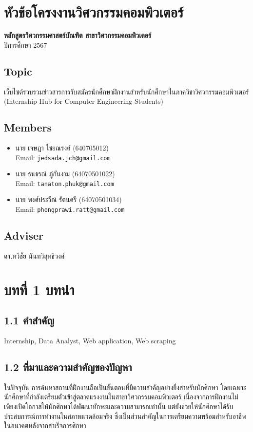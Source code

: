 \documentclass[12pt,oneside,a4paper]{article}
\begin{document}
\section*{หัวข้อโครงงานวิศวกรรมคอมพิวเตอร์}
\textbf{หลักสูตรวิศวกรรมศาสตร์บัณฑิต สาขาวิศวกรรมคอมพิวเตอร์} \\
ปีการศึกษา 2567

\subsection*{Topic}
เว็บไซต์รวบรวมข่าวสารการรับสมัครนักศึกษาฝึกงานสำหรับนักศึกษาในภาควิชาวิศวกรรมคอมพิวเตอร์ \\
(Internship Hub for Computer Engineering Students)

\subsection*{Members}
\begin{itemize}
    \item นาย เจษฎา ไชยณรงค์ (640705012) \\ Email: \texttt{jedsada.jch@gmail.com}
    \item นาย ธนธรณ์ ภู่กันงาม (64070501022) \\ Email: \texttt{tanaton.phuk@gmail.com}
    \item นาย พงศ์ประวีณ์ รัตนศรี (64070501034) \\ Email: \texttt{phongprawi.ratt@gmail.com}
\end{itemize}

\subsection*{Adviser}
ดร.ทวีชัย นันทวิสุทธิวงศ์

\newpage
\section{บทที่ 1 บทนำ}
\subsection{1.1 คำสำคัญ}
Internship, Data Analyst, Web application, Web scraping

\subsection{1.2 ที่มาและความสำคัญของปัญหา}
ในปัจจุบัน การค้นหาสถานที่ฝึกงานถือเป็นขั้นตอนที่มีความสำคัญอย่างยิ่งสำหรับนักศึกษา โดยเฉพาะนักศึกษาที่กำลังเตรียมตัวเข้าสู่ตลาดแรงงานในสาขาวิศวกรรมคอมพิวเตอร์ เนื่องจากการฝึกงานไม่เพียงเปิดโอกาสให้นักศึกษาได้พัฒนาทักษะและความสามารถเท่านั้น แต่ยังช่วยให้นักศึกษาได้รับประสบการณ์การทำงานในสภาพแวดล้อมจริง ซึ่งเป็นส่วนสำคัญในการเตรียมความพร้อมสำหรับอาชีพในอนาคตหลังจากสำเร็จการศึกษา
\end{document}
